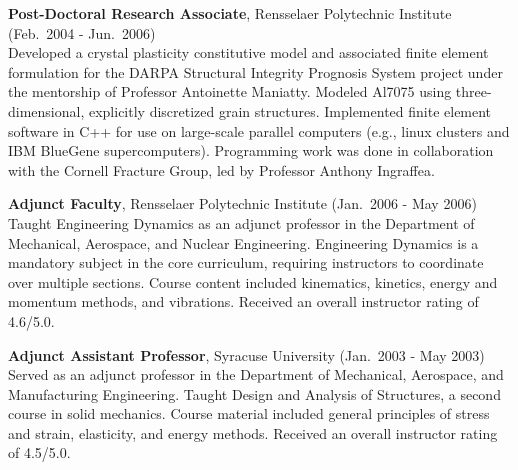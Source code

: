 \begin{minipage}{\minipagewidth}
\textbf{Post-Doctoral Research Associate}, Rensselaer Polytechnic Institute (Feb.~2004 - Jun.~2006) \\
%
Developed a crystal plasticity constitutive model and associated finite element formulation for the DARPA Structural Integrity Prognosis System project under the mentorship of Professor Antoinette Maniatty.  Modeled Al7075 using three-dimensional, explicitly discretized grain structures.  Implemented finite element software in C++ for use on large-scale parallel computers (e.g., linux clusters and IBM BlueGene supercomputers).  Programming work was done in collaboration with the Cornell Fracture Group, led by Professor Anthony Ingraffea.
\end{minipage}\vspace{\parskip}

\begin{minipage}{\minipagewidth}
\textbf{Adjunct Faculty}, Rensselaer Polytechnic Institute (Jan.~2006 - May 2006) \\
%
Taught Engineering Dynamics as an adjunct professor in the Department of Mechanical, Aerospace, and Nuclear Engineering.  Engineering Dynamics is a mandatory subject in the core curriculum, requiring instructors to coordinate over multiple sections.  Course content included kinematics, kinetics, energy and momentum methods, and vibrations.  Received an overall instructor rating of 4.6/5.0.
\end{minipage}\vspace{\parskip}


\begin{minipage}{\minipagewidth}
\textbf{Adjunct Assistant Professor}, Syracuse University (Jan.~2003 - May 2003) \\
%
Served as an adjunct professor in the Department of Mechanical, Aerospace, and Manufacturing Engineering.  Taught Design and Analysis of Structures, a second course in solid mechanics.  Course material included general principles of stress and strain, elasticity, and energy methods.  Received an overall instructor rating of 4.5/5.0.
\end{minipage}\vspace{\parskip}


